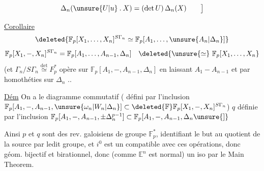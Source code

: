 \[
 \Delta_n(\unsure{U|u}\mathbin{.}X)=(\det U)\,\Delta_n(X)\qquad\big]
\]


\uline{Corollaire}\quad
\[
 \deleted{\mathbb F_p[X_1,\ldots,X_n]^{S\Gamma_n}\simeq
 \mathbb F_p[A_1,\ldots,\unsure{A_n|\Delta_n}]}
\]
\[
 \mathbb F_p[X_1,-,X_n]^{S\Gamma_n}
 =\mathbb F_p[A_1,\ldots,A_{n-1},\Delta_n]\quad
 \deleted{\unsure{\simeq}\ \mathbb F_p[X_1,\ldots,X_n}
\]
(et $\Gamma_n/S\Gamma_n\overset{\det}{\simeq} F_p^*$ opère sur
$\mathbb F_p[A_1,-,A_{n-1},\Delta_n]$ en laissant $A_1-A_{n-1}$ et par homothéties sur $\Delta_n$ ..

\uline{Dém} On a le diagramme commutatif
( défini par l'inclusion
$\mathbb F_p[A_1,-,A_{n-1},\unsure{\omega_n|W_n|\Delta_n}]\subset
\deleted{\mathbb F}\mathbb F_p[X_1,-,X_n]^{S\Gamma_n}$)
$q$ définie par l'inclusion
$\mathbb F_p[A_1,-,A_{n-1},\pm\Delta_n^{p-1}]\subset
\mathbb F_p[A_1,-,A_{n-1},\Delta_n\unsure{]}$

Ainsi $p$ et $q$ sont des rev. galoisiens de groupe $\mathbb F_p^*$, identifiant le but au quotient de la source par ledit groupe, et $i^0$ est un  compatible avec ces opérations, donc géom. bijectif et birationnel, donc (comme $\mathbb E^n$ est normal) un iso par le Main Theorem.
